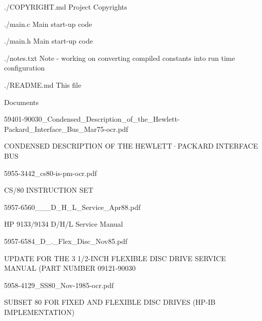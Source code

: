 \begin{DoxyItemize}
\item ./\+C\+O\+P\+Y\+R\+I\+G\+HT.md Project Copyrights
\item ./main.c Main start-\/up code
\item ./main.h Main start-\/up code
\item ./notes.txt Note -\/ working on converting compiled constants into run time configuration
\item ./\+R\+E\+A\+D\+ME.md This file
\item Documents
\begin{DoxyItemize}
\item 59401-\/90030\+\_\+\+Condensed\+\_\+\+Description\+\_\+of\+\_\+the\+\_\+\+Hewlett-\/\+Packard\+\_\+\+Interface\+\_\+\+Bus\+\_\+\+Mar75-\/ocr.\+pdf
\begin{DoxyItemize}
\item C\+O\+N\+D\+E\+N\+S\+ED D\+E\+S\+C\+R\+I\+P\+T\+I\+ON OF T\+HE H\+E\+W\+L\+E\+T\+T·\+P\+A\+C\+K\+A\+RD I\+N\+T\+E\+R\+F\+A\+CE B\+US
\end{DoxyItemize}
\item 5955-\/3442\+\_\+cs80-\/is-\/pm-\/ocr.\+pdf
\begin{DoxyItemize}
\item C\+S/80 I\+N\+S\+T\+R\+U\+C\+T\+I\+ON S\+ET
\end{DoxyItemize}
\item 5957-\/6560\+\_\+\_\+\_\+\+D\+\_\+\+H\+\_\+\+L\+\_\+\+Service\+\_\+\+Apr88.\+pdf
\begin{DoxyItemize}
\item HP 9133/9134 D/\+H/L Service Manual
\end{DoxyItemize}
\item 5957-\/6584\+\_\+D\+\_.\+\_\+\+Flex\+\_\+\+Disc\+\_\+\+Nov85.\+pdf
\begin{DoxyItemize}
\item U\+P\+D\+A\+TE F\+OR T\+HE 3 1/2-\/\+I\+N\+CH F\+L\+E\+X\+I\+B\+LE D\+I\+SC D\+R\+I\+VE S\+E\+R\+V\+I\+CE M\+A\+N\+U\+AL (P\+A\+RT N\+U\+M\+B\+ER 09121-\/90030
\end{DoxyItemize}
\item 5958-\/4129\+\_\+\+S\+S80\+\_\+\+Nov-\/1985-\/ocr.\+pdf
\begin{DoxyItemize}
\item S\+U\+B\+S\+ET 80 F\+OR F\+I\+X\+ED A\+ND F\+L\+E\+X\+I\+B\+LE D\+I\+SC D\+R\+I\+V\+ES (H\+P-\/\+IB I\+M\+P\+L\+E\+M\+E\+N\+T\+A\+T\+I\+ON)
\end{DoxyItemize}

\end{DoxyItemize}
\end{DoxyItemize}
